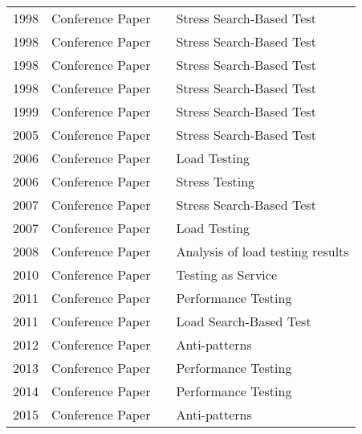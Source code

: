 \begin{table}[]
\begin{tabular}{llll}
1998          & Conference Paper & \cite{Alander}                  & Stress Search-Based Test         \\
1998          & Conference Paper & \cite{Puschner1998}             & Stress Search-Based Test         \\
1998          & Conference Paper & \cite{Mueller1998}              & Stress Search-Based Test         \\
1998          & Conference Paper & \cite{Sullivan}                 & Stress Search-Based Test         \\
1999          & Conference Paper & \cite{Wegener1999}              & Stress Search-Based Test         \\
2005          & Conference Paper & \cite{Canfora}                  & Stress Search-Based Test         \\
2006          & Conference Paper & \cite{Draheim2006b}             & Load Testing                     \\
2006          & Conference Paper & \cite{Abu-nimeh2001}            & Stress Testing                   \\
2007          & Conference Paper & \cite{Penta2007}                & Stress Search-Based Test         \\
2007          & Conference Paper & \cite{Barros2007}               & Load Testing                     \\
2008          & Conference Paper & \cite{Jiang2008b}               & Analysis of load testing results \\
2010          & Conference Paper & \cite{Yu2010a}                  & Testing as Service               \\
2011          & Conference Paper & \cite{Nivas2011}                & Performance Testing              \\
2011          & Conference Paper & \cite{Alshahwan2001}            & Load Search-Based Test           \\
2012          & Conference Paper & \cite{Arcelli2012}              & Anti-patterns                    \\
2013          & Conference Paper & \cite{Bazilinskyy2013}          & Performance Testing              \\
2014          & Conference Paper & \cite{Gias2014}                 & Performance Testing              \\
2015          & Conference Paper & \cite{Alebrahim}                & Anti-patterns                    \\

\end{tabular}
\end{table}
